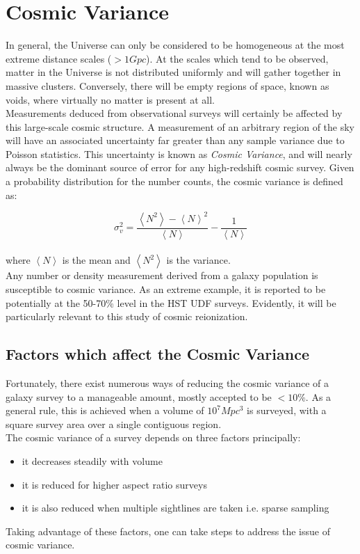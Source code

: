 \documentclass [a4paper, 12pt] {article}
\begin{document}
\section{Cosmic Variance}

In general, the Universe can only be considered to be homogeneous at the most extreme distance scales ($>1 Gpc$). At the scales which tend to be observed, matter in the Universe is not distributed uniformly and will gather together in massive clusters. Conversely, there will be empty regions of space, known as voids, where virtually no matter is present at all. 
\\
\newline
Measurements deduced from observational surveys will certainly be affected by this large-scale cosmic structure. A measurement of an arbitrary region of the sky will have an associated uncertainty far greater than any sample variance due to Poisson statistics. This uncertainty is known as \emph{Cosmic Variance}, and will nearly always be the dominant source of error for any high-redshift cosmic survey. Given a probability distribution for the number counts, the cosmic variance is defined as:

\begin{equation} \label{eq:cvstat}
\sigma _v^2= \frac{\left \langle N^2 \right \rangle - \left \langle N \right \rangle^2}{\left \langle N \right \rangle}-\frac{1}{\left \langle N \right \rangle}
\end{equation}
\\
\newline
where $\left \langle N \right \rangle$ is the mean and $\left \langle N^2 \right \rangle$ is the variance\cite{Trenti2008}.
\\
\newline
Any number or density measurement derived from a galaxy population is susceptible to cosmic variance. As an extreme example, it is reported to be potentially at the 50-70\% level in the HST UDF surveys\cite{Driver01102010}. Evidently, it will be particularly relevant to this study of cosmic reionization.


\subsection{Factors which affect the Cosmic Variance}
Fortunately, there exist numerous ways of reducing the cosmic variance of a galaxy survey to a manageable amount, mostly accepted to be $<10\%$. As a general rule, this is achieved when a volume of $10^7 Mpc^3$ is surveyed, with a square survey area over a single contiguous region\cite{Driver01102010}.
\\
\newline
The cosmic variance of a survey depends on three factors principally:
\begin{itemize}
\item it decreases steadily with volume
\item it is reduced for higher aspect ratio surveys
\item it is also reduced when multiple sightlines are taken i.e. sparse sampling
\end{itemize}
Taking advantage of these factors, one can take steps to address the issue of cosmic variance.
\end{document}
